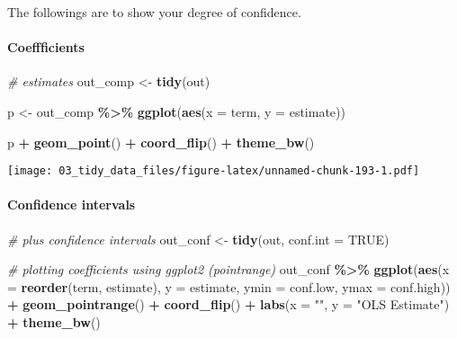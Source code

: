 \documentclass[
]{book}
\newenvironment{Shaded}{\begin{snugshade}}{\end{snugshade}}
\newcommand{\CommentTok}[1]{\textcolor[rgb]{0.56,0.35,0.01}{\textit{#1}}}
\newcommand{\DataTypeTok}[1]{\textcolor[rgb]{0.13,0.29,0.53}{#1}}
\newcommand{\KeywordTok}[1]{\textcolor[rgb]{0.13,0.29,0.53}{\textbf{#1}}}
\newcommand{\NormalTok}[1]{#1}
\newcommand{\OperatorTok}[1]{\textcolor[rgb]{0.81,0.36,0.00}{\textbf{#1}}}
\newcommand{\OtherTok}[1]{\textcolor[rgb]{0.56,0.35,0.01}{#1}}
\newcommand{\StringTok}[1]{\textcolor[rgb]{0.31,0.60,0.02}{#1}}
\begin{document}
The followings are to show your degree of confidence.

\hypertarget{coeffficients}{%
\paragraph{Coeffficients}\label{coeffficients}}

\begin{Shaded}
\begin{Highlighting}[]
\CommentTok{\# estimates}
\NormalTok{out\_comp \textless{}{-}}\StringTok{ }\KeywordTok{tidy}\NormalTok{(out)}

\NormalTok{p \textless{}{-}}\StringTok{ }\NormalTok{out\_comp }\OperatorTok{\%\textgreater{}\%}
\StringTok{  }\KeywordTok{ggplot}\NormalTok{(}\KeywordTok{aes}\NormalTok{(}\DataTypeTok{x =}\NormalTok{ term, }\DataTypeTok{y =}\NormalTok{ estimate))}

\NormalTok{p }\OperatorTok{+}\StringTok{ }\KeywordTok{geom\_point}\NormalTok{() }\OperatorTok{+}
\StringTok{  }\KeywordTok{coord\_flip}\NormalTok{() }\OperatorTok{+}
\StringTok{  }\KeywordTok{theme\_bw}\NormalTok{()}
\end{Highlighting}
\end{Shaded}

\texttt{[image: 03\_tidy\_data\_files/figure-latex/unnamed-chunk-193-1.pdf]}

\hypertarget{confidence-intervals}{%
\paragraph{Confidence intervals}\label{confidence-intervals}}

\begin{Shaded}
\begin{Highlighting}[]
\CommentTok{\# plus confidence intervals}
\NormalTok{out\_conf \textless{}{-}}\StringTok{ }\KeywordTok{tidy}\NormalTok{(out, }\DataTypeTok{conf.int =} \OtherTok{TRUE}\NormalTok{)}

\CommentTok{\# plotting coefficients using ggplot2 (pointrange)}
\NormalTok{out\_conf }\OperatorTok{\%\textgreater{}\%}
\StringTok{  }\KeywordTok{ggplot}\NormalTok{(}\KeywordTok{aes}\NormalTok{(}\DataTypeTok{x =} \KeywordTok{reorder}\NormalTok{(term, estimate), }\DataTypeTok{y =}\NormalTok{ estimate, }\DataTypeTok{ymin =}\NormalTok{ conf.low, }\DataTypeTok{ymax =}\NormalTok{ conf.high)) }\OperatorTok{+}
\StringTok{  }\KeywordTok{geom\_pointrange}\NormalTok{() }\OperatorTok{+}
\StringTok{  }\KeywordTok{coord\_flip}\NormalTok{() }\OperatorTok{+}
\StringTok{  }\KeywordTok{labs}\NormalTok{(}\DataTypeTok{x =} \StringTok{""}\NormalTok{, }\DataTypeTok{y =} \StringTok{"OLS Estimate"}\NormalTok{) }\OperatorTok{+}
\StringTok{  }\KeywordTok{theme\_bw}\NormalTok{()}
\end{Highlighting}
\end{Shaded}
\end{document}
